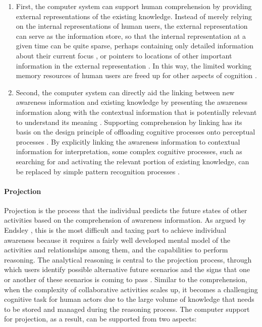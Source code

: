 \begin{enumerate}
   \item First, the computer system can support human comprehension by providing external representations of the existing knowledge. Instead of merely relying on the internal representations of human users, the external representation can serve as the information store, so that the internal representation at a given time can be quite sparse, perhaps containing only detailed information about their current focus \cite{Hegarty2011}, or pointers to locations of other important information in the external representation \cite{M.1996}. In this way, the limited working memory resources of human users are freed up for other aspects of cognition \cite{M.1996}.
   \item Second, the computer system can directly aid the linking between new awareness information and existing knowledge by presenting the awareness information along with the contextual information that is potentially relevant to understand its meaning \cite{Tomaszewski2010}. Supporting comprehension by linking has its basis on the design principle of offloading cognitive processes onto perceptual processes \cite{M.1996}. By explicitly linking the awareness information to contextual information for interpretation, some complex cognitive processes, such as searching for and activating the relevant portion of existing knowledge, can be replaced by simple pattern recognition processes \cite{Hegarty2011}. 
\end{enumerate}

\paragraph*{Projection} %
\label{par:projection}
Projection is the process that the individual predicts the future states of other activities based on the comprehension of awareness information. As argued by Endsley \cite{Endsley1995}, this is the most difficult and taxing part to achieve individual awareness because it requires a fairly well developed mental model of the activities and relationships among them, and the capabilities to perform reasoning. The analytical reasoning is central to the projection process, through which users identify possible alternative future scenarios and the signs that one or another of these scenarios is coming to pass \cite{Thomas2006}. Similar to the comprehension, when the complexity of collaborative activities scales up, it becomes a challenging cognitive task for human actors due to the large volume of knowledge that needs to be stored and managed during the reasoning process. The computer support for projection, as a result, can be supported from two aspects:

